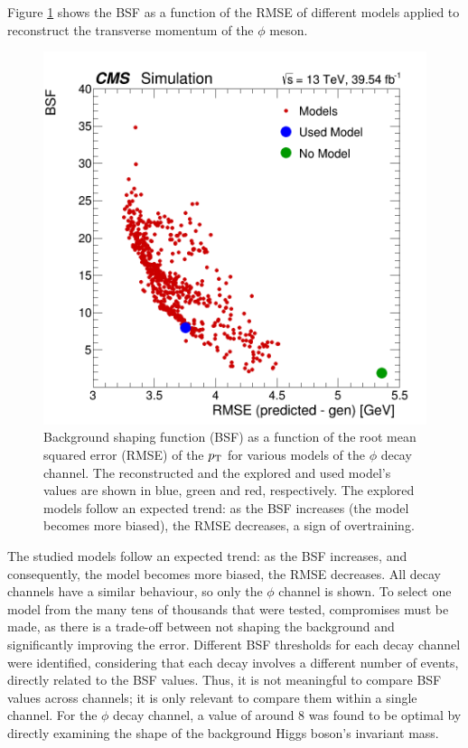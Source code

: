 Figure \ref{fig:BSF_vs_RMSE_phi} shows the BSF as a function of the RMSE of different models applied to reconstruct the transverse momentum of the $\phi$ meson.
\begin{figure}[!ht]
    \captionsetup[subfigure]{labelformat=empty}
    \vspace*{-0.2cm}
    \centering
    \setlength{\mylength}{\textwidth}
    \includegraphics[width=0.49\mylength]{resources/plots/BSF_vs_RMSE_phi.png}
    \caption{Background shaping function (BSF) as a function of the root mean squared error (RMSE) of the $p_\text{T}$ for various models of the $\phi$ decay channel. The reconstructed and the explored and used model's values are shown in blue, green and red, respectively. The explored models follow an expected trend: as the BSF increases (the model becomes more biased), the RMSE decreases, a sign of overtraining.}
    \label{fig:BSF_vs_RMSE_phi}
    \vspace*{-0.0cm}
\end{figure}
The studied models follow an expected trend: as the BSF increases, and consequently, the model becomes more biased, the RMSE decreases. All decay channels have a similar behaviour, so only the $\phi$ channel is shown. To select one model from the many tens of thousands that were tested, compromises must be made, as there is a trade-off between not shaping the background and significantly improving the error. Different BSF thresholds for each decay channel were identified, considering that each decay involves a different number of events, directly related to the BSF values. Thus, it is not meaningful to compare BSF values across channels; it is only relevant to compare them within a single channel. For the $\phi$ decay channel, a value of around 8 was found to be optimal by directly examining the shape of the background Higgs boson's invariant mass.

